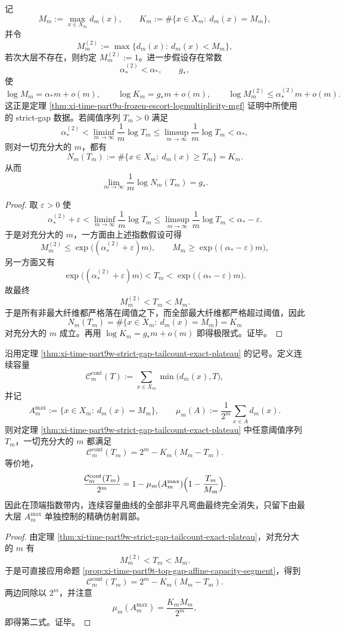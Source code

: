 \begin{theorem}[严格基态间隙强制顶端指数带上的尾计数精确平顶]\label{thm:xi-time-part9w-strict-gap-tailcount-exact-plateau}
记
\[
M_m:=\max_{x\in X_m}d_m(x),
\qquad
K_m:=\#\{x\in X_m:\ d_m(x)=M_m\},
\]
并令
\[
M_m^{(2)}:=
\max\{d_m(x):\ d_m(x)<M_m\},
\]
若次大层不存在，则约定 \(M_m^{(2)}:=1\)。进一步假设存在常数
\[
\alpha_*^{(2)}<\alpha_*,
\qquad
g_*,
\]
使
\[
\log M_m=\alpha_*m+o(m),
\qquad
\log K_m=g_*m+o(m),
\qquad
\log M_m^{(2)}\le \alpha_*^{(2)}m+o(m).
\]
这正是定理 \ref{thm:xi-time-part9u-frozen-escort-logmultiplicity-mgf} 证明中所使用的 strict-gap 数据。若阈值序列 \(T_m>0\) 满足
\[
\alpha_*^{(2)}
<
\liminf_{m\to\infty}\frac{1}{m}\log T_m
\le
\limsup_{m\to\infty}\frac{1}{m}\log T_m
<
\alpha_*,
\]
则对一切充分大的 \(m\)，都有
\[
N_m(T_m):=\#\{x\in X_m:\ d_m(x)\ge T_m\}=K_m.
\]
从而
\[
\lim_{m\to\infty}\frac1m\log N_m(T_m)=g_*.
\]
\end{theorem}
\begin{proof}
取 \(\varepsilon>0\) 使
\[
\alpha_*^{(2)}+\varepsilon
<
\liminf_{m\to\infty}\frac1m\log T_m
\le
\limsup_{m\to\infty}\frac1m\log T_m
<
\alpha_*-\varepsilon.
\]
于是对充分大的 \(m\)，一方面由上述指数假设可得
\[
M_m^{(2)}\le \exp\bigl((\alpha_*^{(2)}+\varepsilon)m\bigr),
\qquad
M_m\ge \exp\bigl((\alpha_*-\varepsilon)m\bigr),
\]
另一方面又有
\[
\exp\bigl((\alpha_*^{(2)}+\varepsilon)m\bigr)
<T_m<
\exp\bigl((\alpha_*-\varepsilon)m\bigr).
\]
故最终
\[
M_m^{(2)}<T_m<M_m.
\]
于是所有非最大纤维都严格落在阈值之下，而全部最大纤维都严格超过阈值，因此
\[
N_m(T_m)=\#\{x\in X_m:\ d_m(x)=M_m\}=K_m
\]
对充分大的 \(m\) 成立。再用 \(\log K_m=g_*m+o(m)\) 即得极限式。证毕。
\end{proof}

\begin{corollary}[严格基态间隙下连续容量曲线的精确仿射肩部]\label{cor:xi-time-part9w-strict-gap-capacity-exact-affine-shoulder}
沿用定理 \ref{thm:xi-time-part9w-strict-gap-tailcount-exact-plateau} 的记号。定义连续容量
\[
\mathcal C_m^{\mathrm{cont}}(T):=
\sum_{x\in X_m}\min\bigl(d_m(x),T\bigr),
\]
并记
\[
A_m^{\max}:=\{x\in X_m:\ d_m(x)=M_m\},
\qquad
\mu_m(A):=\frac1{2^m}\sum_{x\in A}d_m(x).
\]
则对定理 \ref{thm:xi-time-part9w-strict-gap-tailcount-exact-plateau} 中任意阈值序列 \(T_m\)，一切充分大的 \(m\) 都满足
\[
\mathcal C_m^{\mathrm{cont}}(T_m)
=
2^m-K_m(M_m-T_m).
\]
等价地，
\[
\frac{\mathcal C_m^{\mathrm{cont}}(T_m)}{2^m}
=
1-\mu_m(A_m^{\max})\Bigl(1-\frac{T_m}{M_m}\Bigr).
\]
因此在顶端指数带内，连续容量曲线的全部非平凡弯曲最终完全消失，只留下由最大层 \(A_m^{\max}\) 单独控制的精确仿射肩部。
\end{corollary}
\begin{proof}
由定理 \ref{thm:xi-time-part9w-strict-gap-tailcount-exact-plateau}，对充分大的 \(m\) 有
\[
M_m^{(2)}<T_m<M_m.
\]
于是可直接应用命题 \ref{prop:xi-time-part9t-top-gap-affine-capacity-segment}，得到
\[
\mathcal C_m^{\mathrm{cont}}(T_m)=2^m-K_m(M_m-T_m).
\]
两边同除以 \(2^m\)，并注意
\[
\mu_m(A_m^{\max})=\frac{K_mM_m}{2^m},
\]
即得第二式。证毕。
\end{proof}

